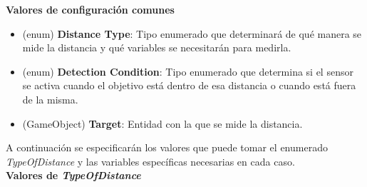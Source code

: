 \textbf{Valores de configuración comunes}
\begin{itemize}
	\item (enum) \textbf{Distance Type}: Tipo enumerado que determinará de qué manera se mide la distancia y qué variables se necesitarán para medirla.
	\item (enum) \textbf{Detection Condition}: Tipo enumerado que determina si el sensor se activa cuando el objetivo está dentro de esa distancia o cuando está fuera de la misma.
	\item (GameObject)\textbf{ Target}: Entidad con la que se mide la distancia.
\end{itemize}

A continuación se especificarán los valores que puede tomar el enumerado \textit{TypeOfDistance} y las variables específicas necesarias en cada caso.\\

\textbf{Valores de \textit{TypeOfDistance}}


